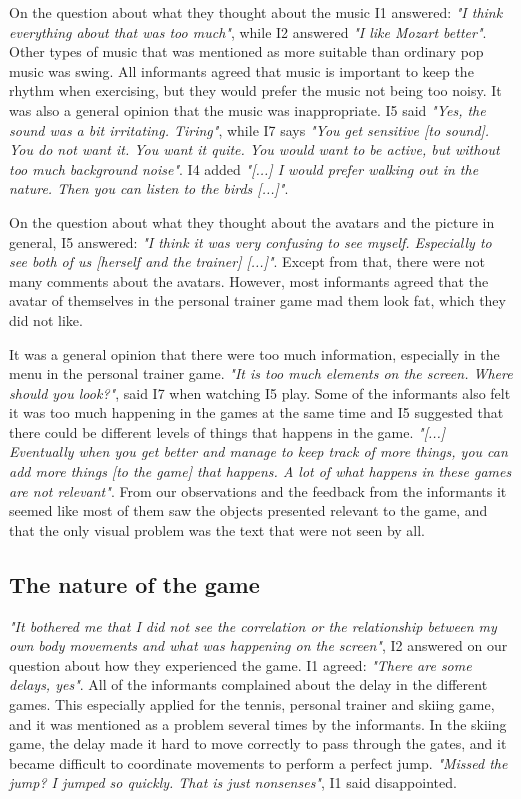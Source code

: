 On the question about what they thought about the music I1 answered: \emph{"I think everything about that was too much"}, while I2 answered \emph{"I like Mozart better"}. Other types of music that was mentioned as more suitable than ordinary pop music was swing. All informants agreed that music is important to keep the rhythm when exercising, but they would prefer the music not being too noisy. It was also a general opinion that the music was inappropriate.  I5 said \emph{"Yes, the sound was a bit irritating. Tiring"}, while I7 says \emph{"You get sensitive [to sound]. You do not want it. You want it quite. You would want to be active, but without too much background noise"}. I4 added \emph{"[...] I would prefer walking out in the nature. Then you can listen to the birds [...]"}.

On the question about what they thought about the avatars and the picture in general, I5 answered: \emph{"I think it was very confusing to see myself. Especially to see both of us [herself and the trainer] [...]"}. Except from that, there were not many comments about the avatars. However, most informants agreed that the avatar of themselves in the personal trainer game mad them look fat, which they did not like. 

It was a general opinion that there were too much information, especially in the menu in the personal trainer game. \emph{"It is too much elements on the screen. Where should you look?"}, said I7 when watching I5 play. Some of the informants also felt it was too much happening in the games at the same time and I5 suggested that there could be different levels of things that happens in the game. \emph{"[...] Eventually when you get better and manage to keep track of more things, you can add more things [to the game] that happens. A lot of what happens in these games are not relevant"}. From our observations and the feedback from the informants it seemed like most of them saw the objects presented relevant to the game, and that the only visual problem was the text that were not seen by all.

\subsection{The nature of the game}
\emph{"It bothered me that I did not see the correlation or the relationship between my own body movements and what was happening on the screen"}, I2 answered on our question about how they experienced the game. I1 agreed: \emph{"There are some delays, yes"}. All of the informants complained about the delay in the different games. This especially applied for the tennis, personal trainer and skiing game, and it was mentioned as a problem several times by the informants. In the skiing game, the delay made it hard to move correctly to pass through the gates, and it became difficult to coordinate movements to perform a perfect jump. \emph{"Missed the jump? I jumped so quickly. That is just nonsenses"}, I1 said disappointed.  

